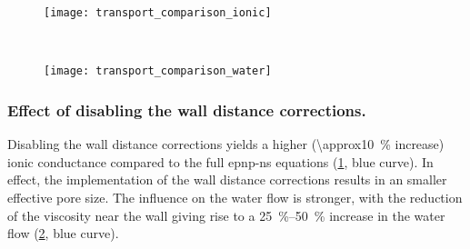 %
\begin{figure*}[p]
  \centering
  \begin{subfigure}[t]{11.5cm}
    \centering
    \caption{}\vspace{0mm}\label{fig:transport_comparison_ionic}
    \texttt{[image: transport\_comparison\_ionic]}
  \end{subfigure}
  \\
  \begin{subfigure}[t]{11.5cm}
    \centering
    \caption{}\vspace{0mm}\label{fig:transport_comparison_water}
    \texttt{[image: transport\_comparison\_water]}
  \end{subfigure}

  \caption[Effect of individ. corrections on the sim. ionic and water conductance]%
  {%
    \textbf{Effect of individual corrections on the simulated ionic and water conductance.}
    ()
    The ionic conductance $\conductance = \current / \vbias$ and
    ()
    the water conductance $\flowcond = \flowrate / \vbias$ of {ClyA-AS} at \SI{+150}{\mV} (left) and
    \SI{-150}{\mV} (right), normalized over the values of the \gls{epnp-ns} equations. Comparison between the
    experimental data (expt.), the simple resistor model (bulk, \cref{eq:bulk_nanopore_current}), classic
    {PNP-NS} ({sim. PNP-NS}), \gls{epnp-ns} without wall distance corrections ({sim. ePNP-NS no WDF}:
    $\diffusion_{i}^w=1$, $\mobility_{i}^w=1$, $\viscosity^w=1$), \gls{epnp-ns} without
    concentration-dependent corrections ({sim. ePNP-NS no CDF}: $\permittivity_{r,\text{f}}^c=1$,
    $\diffusion_{i}^c=1$, $\mobility_{i}^c=1$, $\viscosity^c=1$, $\density^c=1$), \gls{epnp-ns} without steric
    effect ({sim. ePNP-NS no SMP}: $\vec{\beta}=0$) and full with all corrections enabled (\ie~\gls{epnp-ns}).
  }\label{fig:transport_comparison}
\end{figure*}
%

%
\subsubsection{Effect of disabling the wall distance corrections.}
%

Disabling the wall distance corrections yields a higher (\SI{\approx10}{\percent} increase) ionic conductance
compared to the full \gls{epnp-ns} equations (\cref{fig:transport_comparison_ionic}, blue curve). In effect,
the implementation of the wall distance corrections results in an smaller effective pore size.  The influence
on the water flow is stronger, with the reduction of the viscosity near the wall giving rise to a
\SIrange{25}{50}{\percent} increase in the water flow (\cref{fig:transport_comparison_water}, blue curve).

